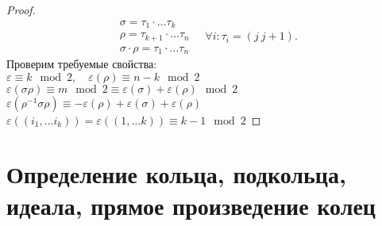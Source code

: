 \documentclass[11pt]{book}
\theoremstyle{definition}
\theoremstyle{plain}
\theoremstyle{plain}
\theoremstyle{definition}
\theoremstyle{remark}
\begin{document}
\begin{proof}
    \[
	\begin{array}{l}
	    \sigma  = \tau_1 \cdot \ldots\tau_k \\
	    \rho = \tau_{k+1} \cdot \ldots \tau_n\\
	    \sigma \cdot \rho = \tau_1 \cdot \ldots \tau_n
	\end{array} \quad \forall i: \tau_i = (j~j+1)
    .\]
    Проверим требуемые свойства: \\
    $\varepsilon \equiv k \mod 2, \quad \varepsilon (\rho) \equiv n-k\mod 2$\\
    $\varepsilon (\sigma \rho) \equiv m \mod 2 \equiv \varepsilon (\sigma ) + \varepsilon (\rho) \mod 2$ \\
    $\varepsilon (\rho^{-1} \sigma \rho) \equiv - \varepsilon (\rho) + \varepsilon (\sigma ) + \varepsilon (\rho)  $\\
    $\varepsilon ((i_1, \ldots i_k)) = \varepsilon ((1, \ldots k)) \equiv k-1 \mod 2$
\end{proof}
\section{Определение кольца, подкольца, идеала, прямое произведение колец}
\end{document}
